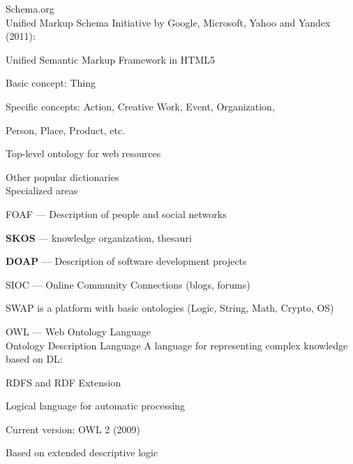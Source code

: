 \begin{frame}{Schema.org\\Unified Markup Schema}
	\topline
	\justifying
	Initiative by Google, Microsoft, Yahoo and Yandex (2011):
	\begin{textitemize}
		\item Unified Semantic Markup Framework in HTML5
		\item Basic concept: Thing
		\item Specific concepts: Action, Creative Work, Event, Organization, \item Person, Place, Product, etc.
		\item Top-level ontology for web resources
	\end{textitemize}
\end{frame}

\begin{frame}{Other popular dictionaries\\Specialized areas}
	\topline
	\justifying
	\begin{textitemize}
		\item FOAF --- Description of people and social networks
		\item \textbf{SKOS} --- knowledge organization, thesauri
		\item \textbf{DOAP} --- Description of software development projects
		\item SIOC --- Online Community Connections (blogs, forums)
		\item SWAP is a platform with basic ontologies (Logic, String, Math, Crypto, OS)
	\end{textitemize}
\end{frame}

\begin{frame}{OWL --- Web Ontology Language\\Ontology Description Language}
	\topline
	\justifying
	A language for representing complex knowledge based on DL:
	\begin{textitemize}
		\item RDFS and RDF Extension
		\item Logical language for automatic processing
		\item Current version: OWL 2 (2009)
		\item Based on extended descriptive logic
	\end{textitemize}
\end{frame}

